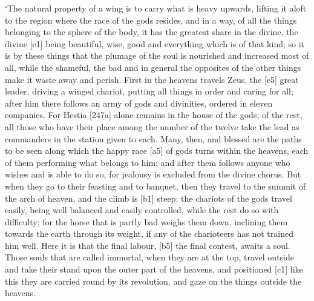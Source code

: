 ‘The natural property of a wing is to carry what is heavy upwards,
lifting it aloft to the region where the race of the gods resides, and
in a way, of all the
things belonging to the sphere of the body, it has the greatest share in
the divine, the divine {[}e1{]} being beautiful, wise, good and
everything which is of that
kind; so it is by these
things that the plumage of the soul is nourished and increased most of
all, while the shameful, the bad and in general the opposites of the
other things make it waste away and perish. First in the heavens travels
Zeus, the {[}e5{]} great leader, driving a winged chariot, putting all
things in order and caring for all; after him there follows an army of
gods and divinities, ordered in eleven companies. For Hestia {[}247a{]}
alone remains in the
house of the gods; of the rest, all those who have their place among the
number of the twelve take the lead as commanders in the station given to
each. Many, then, and blessed are the paths to be seen along which the
happy race {[}a5{]} of gods turns within the heavens, each of them
performing what belongs to him; and after them follows anyone who wishes
and is able to do so, for jealousy is excluded from the divine chorus.
But when they go to their feasting and to banquet, then they travel to
the summit of the arch of heaven, and the climb is {[}b1{]} steep: the
chariots of the gods travel easily, being well balanced and easily
controlled, while the rest do so with difficulty; for the horse that is
partly bad weighs them down, inclining them towards the earth through
its weight, if any of the charioteers has not trained him well. Here it
is that the final labour,
{[}b5{]} the final contest, awaits a soul. Those souls that are called
immortal, when they are
at the top, travel outside and take their stand upon the outer part of
the heavens, and positioned {[}c1{]} like this they are carried round by
its revolution, and gaze on the things outside the heavens.

